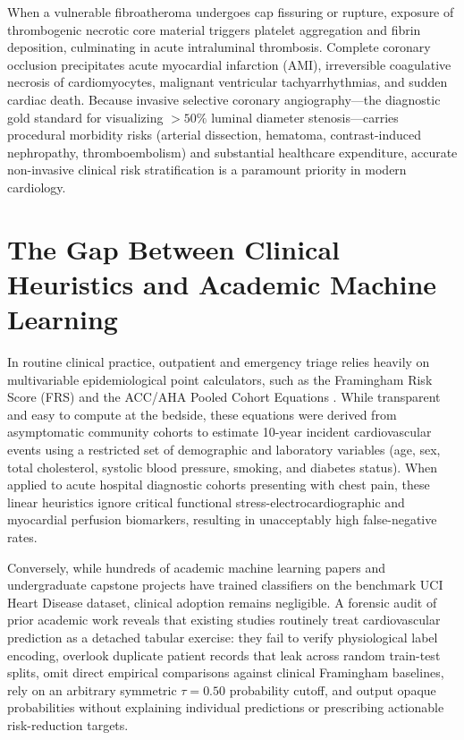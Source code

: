 \documentclass[12pt,a4paper]{report}
\begin{document}
When a vulnerable fibroatheroma undergoes cap fissuring or rupture, exposure of thrombogenic necrotic core material triggers platelet aggregation and fibrin deposition, culminating in acute intraluminal thrombosis. Complete coronary occlusion precipitates acute myocardial infarction (AMI), irreversible coagulative necrosis of cardiomyocytes, malignant ventricular tachyarrhythmias, and sudden cardiac death. Because invasive selective coronary angiography---the diagnostic gold standard for visualizing $>50\%$ luminal diameter stenosis---carries procedural morbidity risks (arterial dissection, hematoma, contrast-induced nephropathy, thromboembolism) and substantial healthcare expenditure, accurate non-invasive clinical risk stratification is a paramount priority in modern cardiology.

\section{The Gap Between Clinical Heuristics and Academic Machine Learning}
In routine clinical practice, outpatient and emergency triage relies heavily on multivariable epidemiological point calculators, such as the Framingham Risk Score (FRS) \cite{wilson1998prediction,dagostino2008general} and the ACC/AHA Pooled Cohort Equations \cite{goff2014acc}. While transparent and easy to compute at the bedside, these equations were derived from asymptomatic community cohorts to estimate 10-year incident cardiovascular events using a restricted set of demographic and laboratory variables (age, sex, total cholesterol, systolic blood pressure, smoking, and diabetes status). When applied to acute hospital diagnostic cohorts presenting with chest pain, these linear heuristics ignore critical functional stress-electrocardiographic and myocardial perfusion biomarkers, resulting in unacceptably high false-negative rates.

Conversely, while hundreds of academic machine learning papers and undergraduate capstone projects have trained classifiers on the benchmark UCI Heart Disease dataset, clinical adoption remains negligible. A forensic audit of prior academic work reveals that existing studies routinely treat cardiovascular prediction as a detached tabular exercise: they fail to verify physiological label encoding, overlook duplicate patient records that leak across random train-test splits, omit direct empirical comparisons against clinical Framingham baselines, rely on an arbitrary symmetric $\tau=0.50$ probability cutoff, and output opaque probabilities without explaining individual predictions or prescribing actionable risk-reduction targets.
\end{document}
